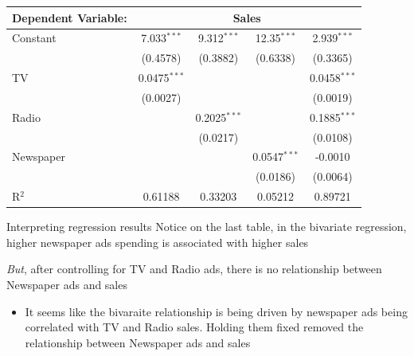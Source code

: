 \documentclass[aspectratio=169,t,11pt,table]{beamer}
\begin{document}
\begin{frame}{}{}
  \bigskip
  \begin{center}
    \small
    \begin{tabular}{lcccc}
      \toprule
      Dependent Variable: & \multicolumn{4}{c}{Sales}\\
      \midrule
      Constant     & 7.033$^{***}$  & 9.312$^{***}$  & 12.35$^{***}$  & 2.939$^{***}$\\   
                    & (0.4578)       & (0.3882)       & (0.6338)       & (0.3365)\\   
      TV           & 0.0475$^{***}$ &                &                & 0.0458$^{***}$\\   
                    & (0.0027)       &                &                & (0.0019)\\   
      Radio        &                & 0.2025$^{***}$ &                & 0.1885$^{***}$\\   
                    &                & (0.0217)       &                & (0.0108)\\   
      Newspaper    &                &                & 0.0547$^{***}$ & -0.0010\\   
                    &                &                & (0.0186)       & (0.0064)\\   
      \midrule
      R$^2$        & 0.61188        & 0.33203        & 0.05212        & 0.89721\\  
      \bottomrule
    \end{tabular}
  \end{center}
\end{frame}

\begin{frame}{Interpreting regression results}
  Notice on the last table, in the bivariate regression, higher newspaper ads spending is associated with higher sales

  \bigskip
  \emph{But}, after controlling for TV and Radio ads, there is no relationship between Newspaper ads and sales
  \begin{itemize}
    \item It seems like the bivaraite relationship is being driven by newspaper ads being correlated with TV and Radio sales. 
    Holding them fixed removed the relationship between Newspaper ads and sales
  \end{itemize}
\end{frame}
\end{document}
